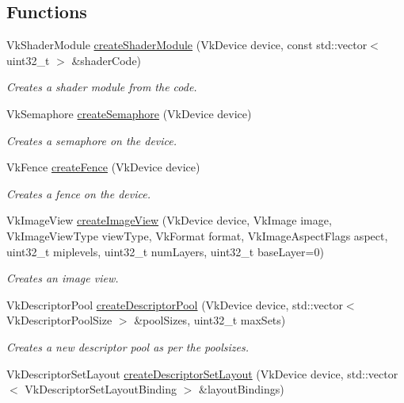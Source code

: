 \subsection*{Functions}
\begin{DoxyCompactItemize}
\item 
Vk\+Shader\+Module \hyperlink{namespaceblaze_1_1util_a8d7a2f0c8db42c93f89e319a727c6591}{create\+Shader\+Module} (Vk\+Device device, const std\+::vector$<$ uint32\+\_\+t $>$ \&shader\+Code)
\begin{DoxyCompactList}\small\item\em Creates a shader module from the code. \end{DoxyCompactList}\item 
Vk\+Semaphore \hyperlink{namespaceblaze_1_1util_add9b9a89cbb94d263d59af682ad6c482}{create\+Semaphore} (Vk\+Device device)
\begin{DoxyCompactList}\small\item\em Creates a semaphore on the device. \end{DoxyCompactList}\item 
Vk\+Fence \hyperlink{namespaceblaze_1_1util_aff4f820d4c849f27184a49151063f2ae}{create\+Fence} (Vk\+Device device)
\begin{DoxyCompactList}\small\item\em Creates a fence on the device. \end{DoxyCompactList}\item 
Vk\+Image\+View \hyperlink{namespaceblaze_1_1util_a940696ad8258e65b95e2c10e553f0525}{create\+Image\+View} (Vk\+Device device, Vk\+Image image, Vk\+Image\+View\+Type view\+Type, Vk\+Format format, Vk\+Image\+Aspect\+Flags aspect, uint32\+\_\+t miplevels, uint32\+\_\+t num\+Layers, uint32\+\_\+t base\+Layer=0)
\begin{DoxyCompactList}\small\item\em Creates an image view. \end{DoxyCompactList}\item 
Vk\+Descriptor\+Pool \hyperlink{namespaceblaze_1_1util_aaed1ad5722a1038338250760d95d5b48}{create\+Descriptor\+Pool} (Vk\+Device device, std\+::vector$<$ Vk\+Descriptor\+Pool\+Size $>$ \&pool\+Sizes, uint32\+\_\+t max\+Sets)
\begin{DoxyCompactList}\small\item\em Creates a new descriptor pool as per the poolsizes. \end{DoxyCompactList}\item 
Vk\+Descriptor\+Set\+Layout \hyperlink{namespaceblaze_1_1util_a972063630bc98ebe3805b77d73848250}{create\+Descriptor\+Set\+Layout} (Vk\+Device device, std\+::vector$<$ Vk\+Descriptor\+Set\+Layout\+Binding $>$ \&layout\+Bindings)

\end{DoxyCompactItemize}
